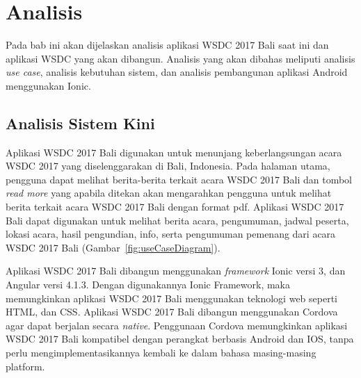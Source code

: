 \chapter{Analisis}
\label{chap:analisis}

Pada bab ini akan dijelaskan analisis aplikasi WSDC 2017 Bali saat ini dan aplikasi WSDC yang akan dibangun. Analisis yang akan dibahas meliputi analisis {\it use case}, analisis kebutuhan sistem, dan analisis pembangunan aplikasi Android menggunakan Ionic.

\section{Analisis Sistem Kini}
\label{sec:analisisSistemKini}
Aplikasi WSDC 2017 Bali digunakan untuk menunjang keberlangsungan acara WSDC 2017 yang diselenggarakan di Bali, Indonesia. Pada halaman utama, pengguna dapat melihat berita-berita terkait acara WSDC 2017 Bali dan tombol {\it read more} yang apabila ditekan akan mengarahkan pengguna untuk melihat berita terkait acara WSDC 2017 Bali dengan format pdf. Aplikasi WSDC 2017 Bali dapat digunakan untuk melihat berita acara, pengumuman, jadwal peserta, lokasi acara, hasil pengundian, info, serta pengumuman pemenang dari acara WSDC 2017 Bali (Gambar~\ref{fig:useCaseDiagram}). 

Aplikasi WSDC 2017 Bali dibangun menggunakan {\it framework} Ionic versi 3, dan Angular versi 4.1.3. Dengan digunakannya Ionic Framework, maka memungkinkan aplikasi WSDC 2017 Bali menggunakan teknologi web seperti HTML, dan CSS. Aplikasi WSDC 2017 Bali dibangun menggunakan Cordova agar dapat berjalan secara {\it native}. Penggunaan Cordova memungkinkan aplikasi WSDC 2017 Bali kompatibel dengan perangkat berbasis Android dan IOS, tanpa perlu mengimplementasikannya kembali ke dalam bahasa masing-masing platform.

